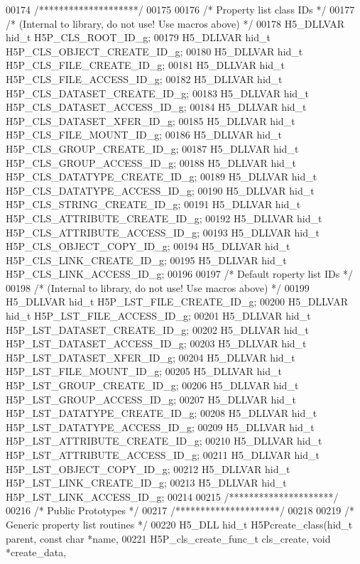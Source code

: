 \begin{DoxyCode}
00174 \textcolor{comment}{/********************/}
00175 
00176 \textcolor{comment}{/* Property list class IDs */}
00177 \textcolor{comment}{/* (Internal to library, do not use!  Use macros above) */}
00178 H5\_DLLVAR hid\_t H5P\_CLS\_ROOT\_ID\_g;
00179 H5\_DLLVAR hid\_t H5P\_CLS\_OBJECT\_CREATE\_ID\_g;
00180 H5\_DLLVAR hid\_t H5P\_CLS\_FILE\_CREATE\_ID\_g;
00181 H5\_DLLVAR hid\_t H5P\_CLS\_FILE\_ACCESS\_ID\_g;
00182 H5\_DLLVAR hid\_t H5P\_CLS\_DATASET\_CREATE\_ID\_g;
00183 H5\_DLLVAR hid\_t H5P\_CLS\_DATASET\_ACCESS\_ID\_g;
00184 H5\_DLLVAR hid\_t H5P\_CLS\_DATASET\_XFER\_ID\_g;
00185 H5\_DLLVAR hid\_t H5P\_CLS\_FILE\_MOUNT\_ID\_g;
00186 H5\_DLLVAR hid\_t H5P\_CLS\_GROUP\_CREATE\_ID\_g;
00187 H5\_DLLVAR hid\_t H5P\_CLS\_GROUP\_ACCESS\_ID\_g;
00188 H5\_DLLVAR hid\_t H5P\_CLS\_DATATYPE\_CREATE\_ID\_g;
00189 H5\_DLLVAR hid\_t H5P\_CLS\_DATATYPE\_ACCESS\_ID\_g;
00190 H5\_DLLVAR hid\_t H5P\_CLS\_STRING\_CREATE\_ID\_g;
00191 H5\_DLLVAR hid\_t H5P\_CLS\_ATTRIBUTE\_CREATE\_ID\_g;
00192 H5\_DLLVAR hid\_t H5P\_CLS\_ATTRIBUTE\_ACCESS\_ID\_g;
00193 H5\_DLLVAR hid\_t H5P\_CLS\_OBJECT\_COPY\_ID\_g;
00194 H5\_DLLVAR hid\_t H5P\_CLS\_LINK\_CREATE\_ID\_g;
00195 H5\_DLLVAR hid\_t H5P\_CLS\_LINK\_ACCESS\_ID\_g;
00196 
00197 \textcolor{comment}{/* Default roperty list IDs */}
00198 \textcolor{comment}{/* (Internal to library, do not use!  Use macros above) */}
00199 H5\_DLLVAR hid\_t H5P\_LST\_FILE\_CREATE\_ID\_g;
00200 H5\_DLLVAR hid\_t H5P\_LST\_FILE\_ACCESS\_ID\_g;
00201 H5\_DLLVAR hid\_t H5P\_LST\_DATASET\_CREATE\_ID\_g;
00202 H5\_DLLVAR hid\_t H5P\_LST\_DATASET\_ACCESS\_ID\_g;
00203 H5\_DLLVAR hid\_t H5P\_LST\_DATASET\_XFER\_ID\_g;
00204 H5\_DLLVAR hid\_t H5P\_LST\_FILE\_MOUNT\_ID\_g;
00205 H5\_DLLVAR hid\_t H5P\_LST\_GROUP\_CREATE\_ID\_g;
00206 H5\_DLLVAR hid\_t H5P\_LST\_GROUP\_ACCESS\_ID\_g;
00207 H5\_DLLVAR hid\_t H5P\_LST\_DATATYPE\_CREATE\_ID\_g;
00208 H5\_DLLVAR hid\_t H5P\_LST\_DATATYPE\_ACCESS\_ID\_g;
00209 H5\_DLLVAR hid\_t H5P\_LST\_ATTRIBUTE\_CREATE\_ID\_g;
00210 H5\_DLLVAR hid\_t H5P\_LST\_ATTRIBUTE\_ACCESS\_ID\_g;
00211 H5\_DLLVAR hid\_t H5P\_LST\_OBJECT\_COPY\_ID\_g;
00212 H5\_DLLVAR hid\_t H5P\_LST\_LINK\_CREATE\_ID\_g;
00213 H5\_DLLVAR hid\_t H5P\_LST\_LINK\_ACCESS\_ID\_g;
00214 
00215 \textcolor{comment}{/*********************/}
00216 \textcolor{comment}{/* Public Prototypes */}
00217 \textcolor{comment}{/*********************/}
00218 
00219 \textcolor{comment}{/* Generic property list routines */}
00220 H5\_DLL hid\_t H5Pcreate\_class(hid\_t parent, \textcolor{keyword}{const} \textcolor{keywordtype}{char} *name,
00221     H5P\_cls\_create\_func\_t cls\_create, \textcolor{keywordtype}{void} *create\_data,

\end{DoxyCode}
